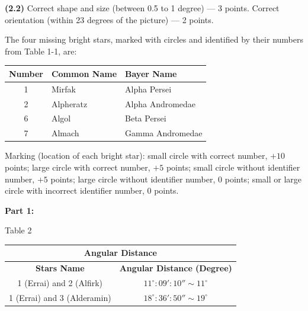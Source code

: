 \textbf{(2.2)} Correct shape and size (between 0.5 to 1 degree) --- 3
points. Correct orientation (within 23 degrees of the picture) --- 2
points.


The four missing bright stars, marked with circles and identified by their
numbers from Table 1-1, are:

\begin{center}
\begin{tabular}{cll}
Number & Common Name & Bayer Name \\
\hline
1 & Mirfak & Alpha Persei \\
2 & Alpheratz & Alpha Andromedae \\
6 & Algol & Beta Persei \\
7 & Almach & Gamma Andromedae \\
\end{tabular}
\end{center}


Marking (location of each bright star): small circle with correct number,
$+10$ points; large circle with correct number, $+5$ points; small circle
without identifier number, $+5$ points; large circle without identifier
number, 0 points; small or large circle with incorrect identifier number,
0 points.


\textbf{Part 1:}

\begin{center}
Table 2

\begin{tabular}{|c|c|}
\hline
\multicolumn{2}{|c|}{\textbf{Angular Distance}}\\
\hline
\textbf{Stars Name} & \textbf{Angular Distance (Degree)}\\
\hline
1 (Errai) and 2 (Alfirk) & $11^\circ\!:09':10'' \sim 11^\circ$\\
\hline
1 (Errai) and 3 (Alderamin) & $18^\circ\!:36':50'' \sim 19^\circ$\\
\hline
\end{tabular}
\end{center}


